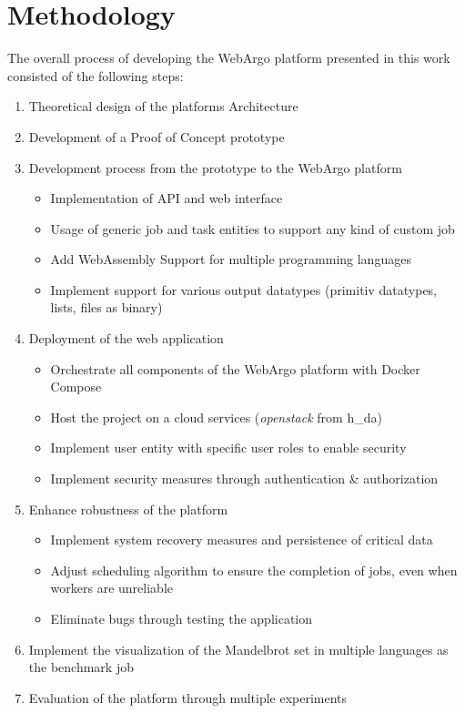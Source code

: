 \chapter{Methodology}
\label{ch:methodology}
The overall process of developing the WebArgo platform presented in this work consisted of the following steps:
\begin{enumerate}
  \item Theoretical design of the platforms Architecture
  \item Development of a Proof of Concept prototype
  \item Development process from the prototype to the WebArgo platform
  \begin{itemize}
    \item Implementation of \acs{API} and web interface
    \item Usage of generic job and task entities to support any kind of custom job
    \item Add WebAssembly Support for multiple programming languages
    \item Implement support for various output datatypes (primitiv datatypes, lists, files as binary)
  \end{itemize}
  \item Deployment of the web application
  \begin{itemize}
    \item Orchestrate all components of the WebArgo platform with Docker Compose \cite{conclusion:docker}
    \item Host the project on a cloud services (\emph{openstack} from h\_da)
    \item Implement user entity with specific user roles to enable security
    \item Implement security measures through authentication \& authorization
  \end{itemize}
  \item Enhance robustness of the platform
  \begin{itemize}
    \item Implement system recovery measures and persistence of critical data
    \item Adjust scheduling algorithm to ensure the completion of jobs, even when workers are unreliable
    \item Eliminate bugs through testing the application
  \end{itemize}
  \item Implement the visualization of the Mandelbrot set in multiple languages as the benchmark job
  \item Evaluation of the platform through multiple experiments 
\end{enumerate}
